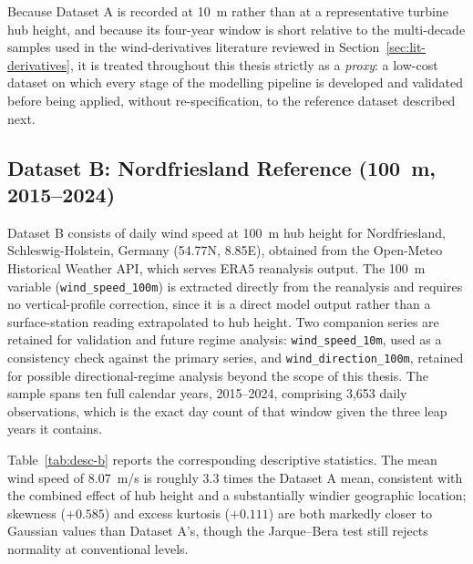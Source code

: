 \documentclass[11pt, a4paper, twoside]{article}
\begin{document}
Because Dataset A is recorded at 10~m rather than at a representative turbine hub height, and because its four-year window is short relative to the multi-decade samples used in the wind-derivatives literature reviewed in Section~\ref{sec:lit-derivatives}, it is treated throughout this thesis strictly as a \emph{proxy}: a low-cost dataset on which every stage of the modelling pipeline is developed and validated before being applied, without re-specification, to the reference dataset described next.

\subsection{Dataset B: Nordfriesland Reference (100~m, 2015--2024)}
\label{sec:data-b}

Dataset B consists of daily wind speed at 100~m hub height for Nordfriesland, Schleswig-Holstein, Germany (54.77\textdegree{}N, 8.85\textdegree{}E), obtained from the Open-Meteo Historical Weather API, which serves ERA5 reanalysis output. The 100~m variable (\texttt{wind\_speed\_100m}) is extracted directly from the reanalysis and requires no vertical-profile correction, since it is a direct model output rather than a surface-station reading extrapolated to hub height. Two companion series are retained for validation and future regime analysis: \texttt{wind\_speed\_10m}, used as a consistency check against the primary series, and \texttt{wind\_direction\_100m}, retained for possible directional-regime analysis beyond the scope of this thesis. The sample spans ten full calendar years, 2015--2024, comprising 3{,}653 daily observations, which is the exact day count of that window given the three leap years it contains.

Table~\ref{tab:desc-b} reports the corresponding descriptive statistics. The mean wind speed of 8.07~m/s is roughly 3.3 times the Dataset A mean, consistent with the combined effect of hub height and a substantially windier geographic location; skewness ($+0.585$) and excess kurtosis ($+0.111$) are both markedly closer to Gaussian values than Dataset A's, though the Jarque--Bera test still rejects normality at conventional levels.
\end{document}
